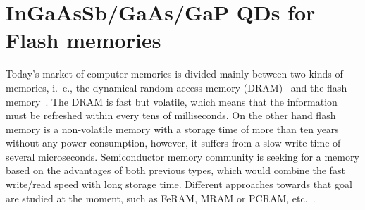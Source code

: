 
\chapter{InGaAsSb/GaAs/GaP QDs for Flash memories}\label{chap:TUB_QD}

Today's market of computer memories is divided mainly between two kinds of memories, i.~e., the dynamical random access memory (DRAM)~\citep{waser_2003} and the flash memory~\citep{Pavan_1997}. The DRAM is fast but volatile, which means that the information must be refreshed within every tens of milliseconds. On the other hand flash memory is a non-volatile memory with a storage time of more than ten years without any power consumption, however, it suffers from a slow write time of several microseconds. Semiconductor memory community is seeking for a memory based on the advantages of both previous types, which would combine the fast write/read speed with long storage time. Different approaches towards that goal are studied at the moment, such as FeRAM, MRAM or PCRAM, etc.~\citep{Burr_IBM2008}.

